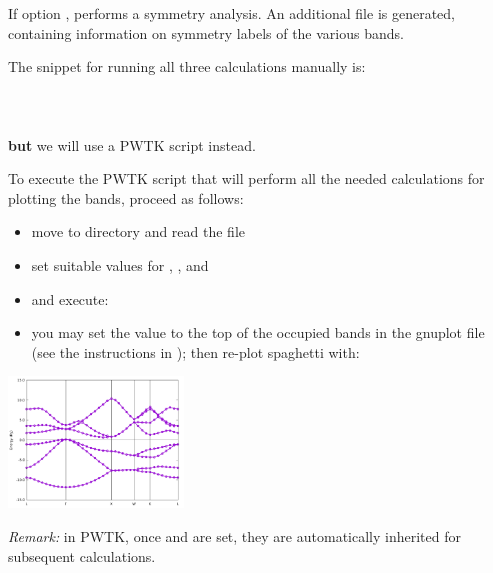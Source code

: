 \documentclass[landscape]{foils}
\begin{document}
If option ,  performs a symmetry
analysis. An additional file  is generated,
containing information on symmetry labels of the various bands.

The snippet for running all three calculations manually is:\\[0.5em]
\\
\\
\\[0.5em]
{\bf  but} we will use a PWTK script instead.

%
To execute the PWTK script that will perform all the needed
calculations for plotting the bands, proceed as follows:\\
\parbox{0.65\textwidth}{
  \begin{itemize}
  \item move to directory
     and read the  file
  \item set suitable values for , , and
  \item and execute: ~
  \item you may set the  value to the top of the occupied
    bands in the gnuplot file  (see the instructions in
    ); then re-plot spaghetti with: 
  \end{itemize}
}\parbox{0.35\textwidth}{
  \begin{flushright}
    \includegraphics[width=0.35\textwidth]{figs/si-bands.pdf}
  \end{flushright}
}

{\em Remark:} in PWTK, once  and  are set,
they are automatically inherited for subsequent calculations.
\end{document}
